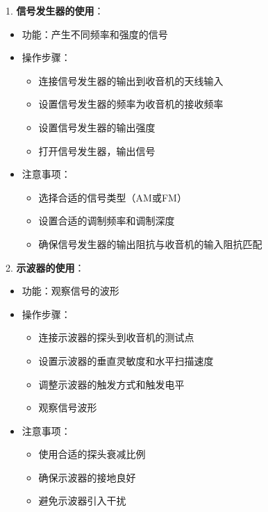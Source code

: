 \documentclass[12pt,UTF8]{ctexbook}
\begin{document}
1. \textbf{信号发生器的使用}：
   \begin{itemize}[leftmargin=3.5em]
   \item 功能：产生不同频率和强度的信号
   \item 操作步骤：
     \begin{itemize}
     \item 连接信号发生器的输出到收音机的天线输入
     \item 设置信号发生器的频率为收音机的接收频率
     \item 设置信号发生器的输出强度
     \item 打开信号发生器，输出信号
     \end{itemize}
   \item 注意事项：
     \begin{itemize}
     \item 选择合适的信号类型（AM或FM）
     \item 设置合适的调制频率和调制深度
     \item 确保信号发生器的输出阻抗与收音机的输入阻抗匹配
     \end{itemize}
   \end{itemize}

2. \textbf{示波器的使用}：
   \begin{itemize}[leftmargin=3.5em]
   \item 功能：观察信号的波形
   \item 操作步骤：
     \begin{itemize}
     \item 连接示波器的探头到收音机的测试点
     \item 设置示波器的垂直灵敏度和水平扫描速度
     \item 调整示波器的触发方式和触发电平
     \item 观察信号波形
     \end{itemize}
   \item 注意事项：
     \begin{itemize}
     \item 使用合适的探头衰减比例
     \item 确保示波器的接地良好
     \item 避免示波器引入干扰
     \end{itemize}
   \end{itemize}
\end{document}
